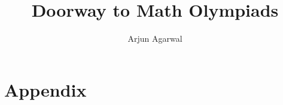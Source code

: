 \documentclass{maaprb}
\title{Doorway to Math Olympiads}
\author{Arjun Agarwal}
\begin{document}
\frontmatter
\maketitle
\mainmatter

\backmatter
\part{Appendix}
\clearpage
\end{document}
